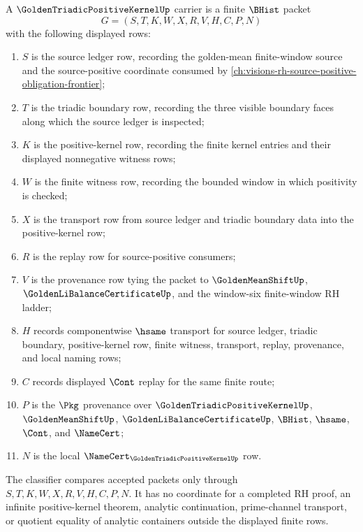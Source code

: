 \begin{definition}
\label{def:golden-triadic-positive-kernel-carrier}
A $\GoldenTriadicPositiveKernelUp$ carrier is a finite $\BHist$ packet
$$
G=(S,T,K,W,X,R,V,H,C,P,N)
$$
with the following displayed rows:
\begin{enumerate}
\item $S$ is the source ledger row, recording the golden-mean finite-window source and the source-positive coordinate consumed by \autoref{ch:visions-rh-source-positive-obligation-frontier};
\item $T$ is the triadic boundary row, recording the three visible boundary faces along which the source ledger is inspected;
\item $K$ is the positive-kernel row, recording the finite kernel entries and their displayed nonnegative witness rows;
\item $W$ is the finite witness row, recording the bounded window in which positivity is checked;
\item $X$ is the transport row from source ledger and triadic boundary data into the positive-kernel row;
\item $R$ is the replay row for source-positive consumers;
\item $V$ is the provenance row tying the packet to $\GoldenMeanShiftUp$, $\GoldenLiBalanceCertificateUp$, and the window-six finite-window RH ladder;
\item $H$ records componentwise $\hsame$ transport for source ledger, triadic boundary, positive-kernel row, finite witness, transport, replay, provenance, and local naming rows;
\item $C$ records displayed $\Cont$ replay for the same finite route;
\item $P$ is the $\Pkg$ provenance over $\GoldenTriadicPositiveKernelUp$, $\GoldenMeanShiftUp$, $\GoldenLiBalanceCertificateUp$, $\BHist$, $\hsame$, $\Cont$, and $\NameCert$;
\item $N$ is the local $\NameCert_{\GoldenTriadicPositiveKernelUp}$ row.
\end{enumerate}
The classifier compares accepted packets only through $S,T,K,W,X,R,V,H,C,P,N$. It has no coordinate for a completed RH proof, an infinite positive-kernel theorem, analytic continuation, prime-channel transport, or quotient equality of analytic containers outside the displayed finite rows.
\end{definition}

